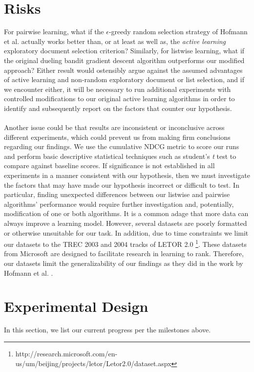 \documentclass{acm_proc_article-sp}
\begin{document}
\section{Risks}
For pairwise learning, what if the $\epsilon$-greedy random selection strategy of Hofmann et al. \cite{hofmann} actually works better than, or at least as well as, the \emph{active learning} exploratory document selection criterion? Similarly, for listwise learning, what if the original dueling bandit gradient descent algorithm outperforms our modified approach? Either result would ostensibly argue against the assumed advantages of active learning and non-random exploratory document or list selection, and if we encounter either, it will be necessary to run additional experiments with controlled modifications to our original active learning algorithms in order to identify and subsequently report on the factors that counter our hypothesis.\\ \\
Another issue could be that results are inconsistent or inconclusive across different experiments, which could prevent us from making firm conclusions regarding our findings. We use the cumulative NDCG metric to score our runs and perform basic descriptive statistical techniques such as student's \emph{t} test to compare against baseline scores. If significance is not established in all experiments in a manner consistent with our hypothesis, then we must investigate the factors that may have made our hypothesis incorrect or difficult to test. In particular, finding unexpected differences between our listwise and pairwise algorithms' performance would require further investigation and,  potentially, modification of one or both algorithms. It is a common adage that more data can always improve a learning model. However, several datasets are poorly formatted or otherwise unsuitable for our task. In addition, due to time constraints we limit our datasets to the TREC 2003 and 2004 tracks of LETOR 2.0 \footnote{http://research.microsoft.com/en-us/um/beijing/projects/letor/Letor2.0/dataset.aspx}. These datasets from Microsoft are designed to facilitate research in learning to rank. Therefore, our datasets limit the generalizability of our findings as they did in the work by Hofmann et al. \cite{hofmann}.

\section{Experimental Design}
In this section, we list our current progress per the milestones above. 
\end{document}
